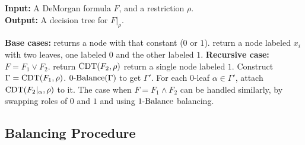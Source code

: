 \documentclass[11pt]{article}
\begin{document}
\begin{algorithm}[H]
\label{alg: CDT}
    \caption{$\CDT(F,\rho)$: Canonical Decision Tree Constructor}
    \label{alg:cdt-algo}
    \textbf{Input:} A DeMorgan formula $F$, and a restriction $\rho$. \\
    \textbf{Output:} A decision tree for $F|_{\rho}$.
    \begin{algorithmic}[1]
        \State \textbf{Base cases:}
            \State returns a node with that constant ($0$ or $1$).
        \EndIf
            \State return a node labeled $x_i$ with two leaves, one labeled $0$ and the other labeled $1$.
        \EndIf
        \State \textbf{Recursive case:} $F = F_1 \lor F_2$.
            \State return $\operatorname{CDT}(F_2, \rho)$
            \State return a single node labeled $1$.
        \Else {}
            \State Construct $\Gamma = \operatorname{CDT}(F_1,\rho)$.
            \State $\operatorname{0-Balance}(\Gamma)$ to get $\Gamma'$.
            \State For each $0$-leaf $\alpha \in \Gamma'$, attach $\operatorname{CDT}(F_2|_\alpha,\rho)$ to it.
        \EndIf
        \State The case when $F = F_1 \land F_2$ can be handled similarly, by swapping roles of $0$ and $1$ and using $\operatorname{1-Balance}$ balancing.
    \end{algorithmic}
\end{algorithm}

\subsection{Balancing Procedure}

        
        
        
\end{document}
